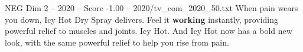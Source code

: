 \begin{textsample}{NEG Dim 2 – 2020 – Score -1.00 – 2020/tv\_com\_2020\_50.txt}  \label{ex:f2_neg_036}
When pain wears you down, Icy Hot Dry Spray delivers.
Feel it \textbf{working} instantly, providing powerful relief to muscles and joints.
Icy Hot.
And Icy Hot now has a bold new look, with the same powerful relief to help you rise from pain.

\end{textsample}
